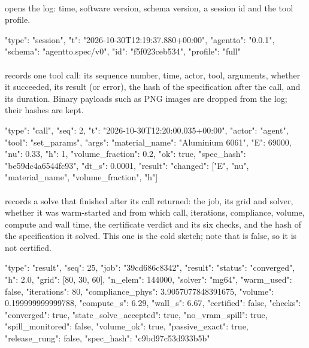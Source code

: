 \paragraph{} opens the log: time, software version, schema version, a session id and the tool profile.
\begin{jsoncode}
{"type": "session", "t": "2026-10-30T12:19:37.880+00:00", "agentto": "0.0.1",
 "schema": "agentto.spec/v0", "id": "f5f023ceb534", "profile": "full"}
\end{jsoncode}

\paragraph{} records one tool call: its sequence number, time, actor, tool, arguments, whether it succeeded,
its result (or error), the hash of the specification after the call, and its duration. Binary payloads such as PNG
images are dropped from the log; their hashes are kept.
\begin{jsoncode}
{"type": "call", "seq": 2, "t": "2026-10-30T12:20:00.035+00:00", "actor": "agent",
 "tool": "set_params",
 "args": {"material_name": "Aluminium 6061", "E": 69000, "nu": 0.33, "h": 1,
          "volume_fraction": 0.2},
 "ok": true, "spec_hash": "be59dc4a6544fc93", "dt_s": 0.0001,
 "result": {"changed": ["E", "nu", "material_name", "volume_fraction", "h"]}}
\end{jsoncode}

\paragraph{} records a solve that finished after its call returned: the job, its grid and solver, whether
it was warm-started and from which call, iterations, compliance, volume, compute and wall time, the certificate
verdict and its six checks, and the hash of the specification it solved. This one is the cold sketch; note that
 is false, so it is not certified.
\begin{jsoncode}
{"type": "result", "seq": 25, "job": "39cd686c8342",
 "result": {"status": "converged", "h": 2.0, "grid": [80, 30, 60],
   "n_elem": 144000, "solver": "mg64", "warm_used": false, "iterations": 80,
   "compliance_phys": 3.9057077848391675, "volume": 0.199999999999788,
   "compute_s": 6.29, "wall_s": 6.67, "certified": false,
   "checks": {"converged": true, "state_solve_accepted": true,
              "no_vram_spill": true, "spill_monitored": false,
              "volume_ok": true, "passive_exact": true},
   "release_rung": false, "spec_hash": "c9bd97c53d933b5b"}}
\end{jsoncode}

